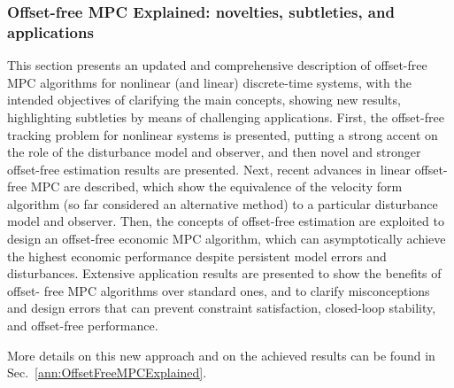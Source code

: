 
\subsubsection{Offset-free MPC Explained: novelties, subtleties, and applications}
\label{sec:OffsetFreeMPCExplained}

This section  presents an updated and comprehensive description of offset-free MPC algorithms for nonlinear (and linear) discrete-time systems, with the intended objectives of clarifying the main concepts, showing new results, highlighting subtleties by means of challenging applications. First, the offset-free tracking problem for nonlinear systems is presented, putting a strong accent on the role of the disturbance model and observer, and then novel and stronger offset-free estimation results are presented. Next, recent advances in linear offset-free MPC are described, which show the equivalence of the velocity form algorithm (so far considered an alternative method) to a particular disturbance model and observer. Then, the concepts of offset-free estimation are exploited to design an offset-free economic MPC algorithm, which can asymptotically achieve the highest economic performance despite persistent model errors and disturbances. Extensive application results are presented to show the benefits of offset-
free MPC algorithms over standard ones, and to clarify misconceptions and design errors that can prevent constraint satisfaction, closed-loop stability, and offset-free performance. 

More details on this new approach and on the achieved results can be found in Sec.~\ref{ann:OffsetFreeMPCExplained}. 